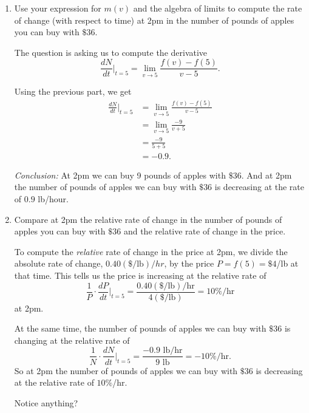 \documentclass{ximera}
\begin{document}
\begin{question}
\begin{enumerate}
\begin{enumerate}
\begin{explanation}
\end{explanation}

\item Use your expression for $m(v)$ and the algebra of limits to compute the rate of change (with respect to time) at 2pm in the number of pounds of apples you can buy with $\$36$. %

\begin{explanation}
The question is asking us to compute the derivative
\[
  \frac{dN}{dt}\Big|_{t=5} = \lim_{v\to 5} \frac{f(v)-f(5)}{v-5} .
\]

Using the previous part, we get
\begin{align*}
\frac{dN}{dt}\Big|_{t=5} &= \lim_{v\to 5} \frac{f(v)-f(5)}{v-5} \\
                                    &= \lim_{v\to 5} \frac{-9}{v+5} \\
                                    &= \frac{-9}{5+5} \\
                                   &= -0.9 .
\end{align*}

\emph{Conclusion:} At 2pm we can buy 9 pounds of apples with $\$36$. And at 2pm the number of pounds of apples we can buy with $\$36$ is decreasing at the rate of $0.9$ lb/hour.
\end{explanation}

\item Compare at 2pm the relative rate of change in the number of pounds of apples you can buy with $\$36$ and the relative rate of change in the price. %

\begin{explanation}
To compute the \emph{relative} rate of change in the price at 2pm, we divide the absolute rate of change, $0.40(\$/\text{lb})/hr$, by the price $P=f(5) = \$4$/lb at that time. This tells us the price is increasing at the relative rate of 
\[
   \frac{1}{P} \cdot \frac{dP}{dt} \Big|_{t=5} = \frac{0.40(\$/\text{lb})/\text{hr}}{4(\$/\text{lb})} = 10\%/\text{hr}
\]
at 2pm.

At the same time, the number of pounds of apples we can buy with $\$36$ is changing at the relative rate of 
\[
  \frac{1}{N} \cdot \frac{dN}{dt} \Big|_{t=5} = \frac{-0.9 \text{ lb/hr}}{9\text{ lb}} = -10\%/\text{hr} .
\]
So at 2pm the number of pounds of apples we can buy with $\$36$ is decreasing at the relative rate of $10\%$/hr.
\end{explanation}

\begin{freeResponse}
Notice anything?
\end{freeResponse}


\end{enumerate}

\end{enumerate}
\end{question}
\end{document}
